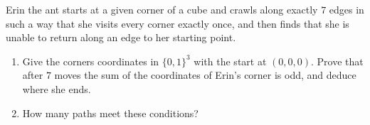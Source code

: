 Erin the ant starts at a given corner of a cube and crawls along exactly $7$ edges in such a way that she visits every corner exactly once, and then finds that she is unable to return along an edge to her starting point.
\begin{enumerate}
\item[(a)] Give the corners coordinates in $\{0,1\}^3$ with the start at $(0,0,0)$. Prove that after $7$ moves the sum of the coordinates of Erin's corner is odd, and deduce where she ends.
\item[(b)] How many paths meet these conditions?
\end{enumerate}

